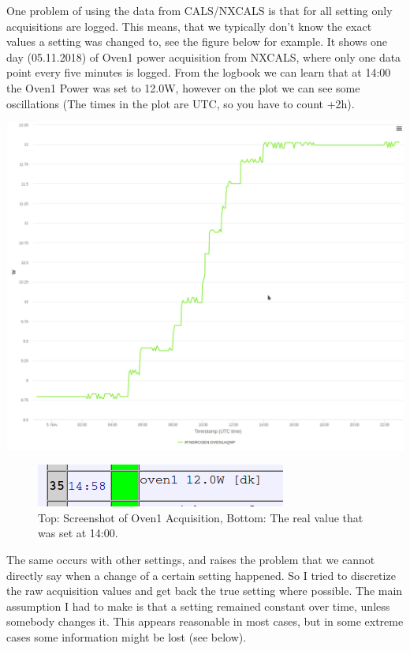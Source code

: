 \documentclass[12pt,a4paper]{article}
\begin{document}
One problem of using the data from CALS/NXCALS is that for all setting
only acquisitions are logged. This means, that we typically don't know
the exact values a setting was changed to, see the figure below for
example. It shows one day (05.11.2018) of Oven1 power acquisition from
NXCALS, where only one data point every five minutes is logged. From the
logbook we can learn that at 14:00 the Oven1 Power was set to 12.0W,
however on the plot we can see some oscillations (The times in the plot
are UTC, so you have to count +2h).

\includegraphics{images/oven1example_05112018.png}

\begin{figure}
\centering
\includegraphics{images/oven1example_logbook_05112018.png}
\caption{Top: Screenshot of Oven1 Acquisition, Bottom: The real value
that was set at 14:00.}
\end{figure}

The same occurs with other settings, and raises the problem that we
cannot directly say when a change of a certain setting happened. So I
tried to discretize the raw acquisition values and get back the true
setting where possible. The main assumption I had to make is that a
setting remained constant over time, unless somebody changes it. This
appears reasonable in most cases, but in some extreme cases some
information might be lost (see below).
\end{document}
